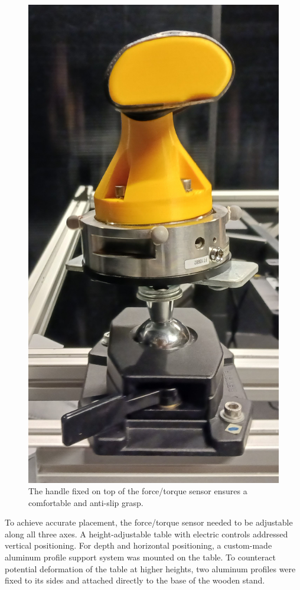 \begin{figure}[!htb]
\begin{minipage}{0.49\linewidth}
\begin{minipage}{0.49\linewidth}
        \end{minipage}
        \hfill
        \begin{minipage}{0.49\linewidth}
            \centering
            \includegraphics[clip,width=0.65\linewidth]{img/chapter_5/handle_02.jpg}
        \end{minipage}
        \caption{The handle fixed on top of the force/torque sensor ensures a comfortable and anti-slip grasp.}
        \label{fig:handle_force_torque}
    \end{minipage}

\end{figure}

To achieve accurate placement, the force/torque sensor needed to be adjustable along all three axes. A height-adjustable table with electric controls addressed vertical positioning. For depth and horizontal positioning, a custom-made aluminum profile support system was mounted on the table. To counteract potential deformation of the table at higher heights, two aluminum profiles were fixed to its sides and attached directly to the base of the wooden stand.

